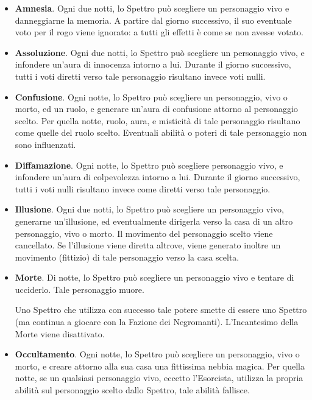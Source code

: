 \documentclass[a4paper,10pt]{article}
\begin{document}
\begin{itemize}

	\item {\bf Amnesia}. Ogni due notti, lo Spettro può scegliere un personaggio vivo e danneggiarne la memoria. A partire dal giorno successivo, il suo eventuale voto per il rogo viene ignorato: a tutti gli effetti è come se non avesse votato.
 
	\item {\bf Assoluzione}. Ogni due notti, lo Spettro può scegliere un personaggio vivo, e infondere un'aura di innocenza intorno a lui. Durante il giorno successivo, tutti i voti diretti verso tale personaggio risultano invece voti nulli.
	
	\item {\bf Confusione}. Ogni notte, lo Spettro può scegliere un personaggio, vivo o morto, ed un ruolo, e generare un'aura di confusione attorno al personaggio scelto. Per quella notte, ruolo, aura, e misticità di tale personaggio risultano come quelle del ruolo scelto. Eventuali abilità o poteri di tale personaggio non sono influenzati.

	\item {\bf Diffamazione}. Ogni notte, lo Spettro può scegliere personaggio vivo, e infondere un'aura di colpevolezza intorno a lui. Durante il giorno successivo, tutti i voti nulli risultano invece come diretti verso tale personaggio.
	
	\item {\bf Illusione}. Ogni due notti, lo Spettro può scegliere un personaggio vivo, generarne un'illusione, ed eventualmente dirigerla verso la casa di un altro personaggio, vivo o morto. Il movimento del personaggio scelto viene cancellato. Se l'illusione viene diretta altrove, viene generato inoltre un movimento (fittizio) di tale personaggio verso la casa scelta.
	
	\item {\bf Morte}. Di notte, lo Spettro può scegliere un personaggio vivo e tentare di ucciderlo. Tale personaggio muore.
	
	Uno Spettro che utilizza con successo tale potere smette di essere uno Spettro (ma continua a giocare con la Fazione dei Negromanti). L'Incantesimo della Morte viene disattivato.
 
	\item {\bf Occultamento}. Ogni notte, lo Spettro può scegliere un personaggio, vivo o morto, e creare attorno alla sua casa una fittissima nebbia magica. Per quella notte, se un qualsiasi personaggio vivo, eccetto l'Esorcista, utilizza la propria abilità sul personaggio scelto dallo Spettro, tale abilità fallisce.
	

\end{itemize}
\end{document}
